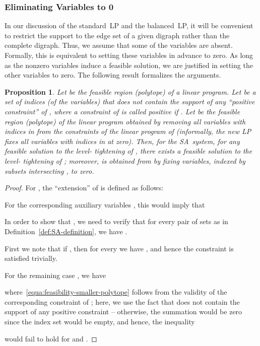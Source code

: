 \documentclass[11pt]{article}
\newtheorem{proposition}[theorem]{Proposition}
\newcommand{\iSA}{\textsf{SA}}
\begin{document}
\subsubsection{Eliminating Variables to 0}\label{sec:EVto0}

In our discussion of the standard~LP and the balanced~LP,
it will be convenient to restrict
the support to the edge set of a given digraph
rather than the complete digraph.
Thus, we assume that some of the variables are absent.
Formally, this is equivalent to setting
these variables in advance to zero.
As long as the nonzero variables induce a feasible solution, we are
justified in setting the other variables to zero.
The following result formalizes the arguments.

\begin{proposition}
Let  be the feasible region (polytope) of a linear program.
Let  be a set of indices (of the variables) that does not contain
the support of any ``positive constraint'' of , where a
constraint  of  is called
positive if .
Let  be the feasible region (polytope) of the linear
program obtained by removing all variables with indices in  from the
constraints of the linear program of  (informally, the
new LP fixes all variables with indices in  at zero).
Then, for the \iSA\ system,
for any feasible solution  to the level- tightening of
, there exists a feasible solution  to the
level- tightening of ; moreover,  is obtained from
 by fixing variables,
indexed by subsets intersecting , to zero.
\end{proposition}
\begin{proof}
For , the ``extension''  of
 is defined as follows:

For the corresponding auxiliary variables , this would imply that

In order to show that , we need to
verify that for every pair of sets  as in
Definition~\ref{def:SA-definition}, we have
.

First we note that if , then for every
 we have , and hence the
constraint is satisfied trivially.

For the remaining case , we have

where~\eqref{equa:feasibility-smaller-polytope} follows from the
validity of the corresponding constraint of ;
here, we use the fact that  does not contain the support of any
positive constraint -- otherwise, the summation 
would be zero since the index set  would be empty,
and hence, the inequality

would fail to hold for  and .
\end{proof}
\end{document}
